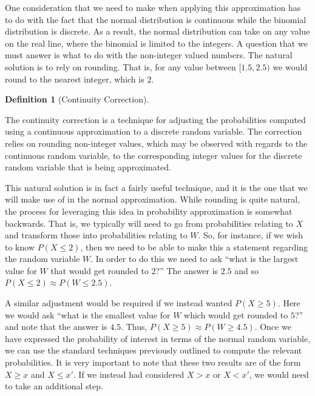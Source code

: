 \documentclass[
  letterpaper,
  DIV=11,
  numbers=noendperiod]{scrreprt}
\theoremstyle{definition}
\theoremstyle{definition}
\theoremstyle{definition}
\newtheorem{definition}{Definition}[chapter]
\theoremstyle{remark}
\begin{document}
One consideration that we need to make when applying this approximation
has to do with the fact that the normal distribution is continuous while
the binomial distribution is discrete. As a result, the normal
distribution can take on any value on the real line, where the binomial
is limited to the integers. A question that we must answer is what to do
with the non-integer valued numbers. The natural solution is to rely on
rounding. That is, for any value between \([1.5, 2.5)\) we would round
to the nearest integer, which is \(2\).

\begin{definition}[Continuity
Correction]\protect\hypertarget{def-continuity-correction}{}\label{def-continuity-correction}

The continuity correction is a technique for adjusting the probabilities
computed using a continuous approximation to a discrete random variable.
The correction relies on rounding non-integer values, which may be
observed with regards to the continuous random variable, to the
corresponding integer values for the discrete random variable that is
being approximated.

\end{definition}

This natural solution is in fact a fairly useful technique, and it is
the one that we will make use of in the normal approximation. While
rounding is quite natural, the process for leveraging this idea in
probability approximation is somewhat backwards. That is, we typically
will need to go from probabilities relating to \(X\) and transform those
into probabilities relating to \(W\). So, for instance, if we wish to
know \(P(X \leq 2)\), then we need to be able to make this a statement
regarding the random variable \(W\). In order to do this we need to ask
``what is the largest value for \(W\) that would get rounded to \(2\)?''
The answer is \(2.5\) and so \(P(X \leq 2) \approx P(W \leq 2.5)\).

A similar adjustment would be required if we instead wanted
\(P(X \geq 5)\). Here we would ask ``what is the smallest value for
\(W\) which would get rounded to \(5\)?'' and note that the answer is
\(4.5\). Thus, \(P(X \geq 5) \approx P(W \geq 4.5)\). Once we have
expressed the probability of interest in terms of the normal random
variable, we can use the standard techniques previously outlined to
compute the relevant probabilities. It is very important to note that
these two results are of the form \(X \geq x\) and \(X \leq x'\). If we
instead had considered \(X > x\) or \(X < x'\), we would need to take an
additional step.
\end{document}
